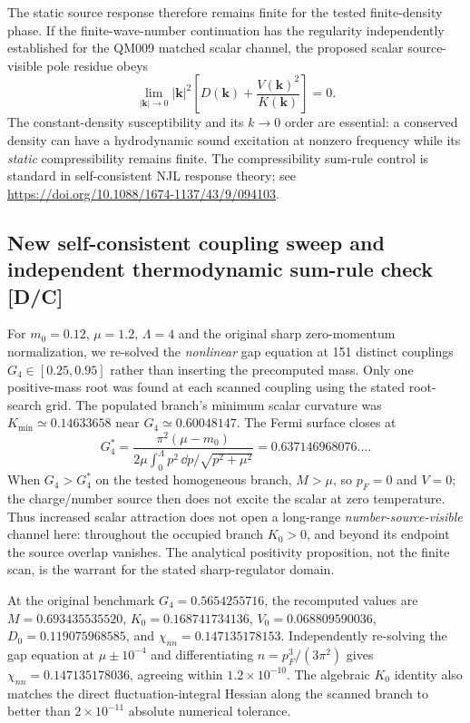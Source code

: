 \documentclass[11pt,a4paper]{article}
\begin{document}
The static source response therefore remains finite for the tested finite-density phase. If the finite-wave-number continuation has the regularity independently established for the QM009 matched scalar channel, the proposed scalar source-visible pole residue obeys
\begin{equation}\label{eq:v10-residue}
\boxed{\lim_{|\bm k|\to0}|\bm k|^2\left[D(\bm k)+\frac{V(\bm k)^2}{K(\bm k)}\right]=0.}
\end{equation}
The constant-density susceptibility and its $k\to0$ order are essential: a conserved density can have a hydrodynamic sound excitation at nonzero frequency while its \emph{static} compressibility remains finite. The compressibility sum-rule control is standard in self-consistent NJL response theory; see \url{https://doi.org/10.1088/1674-1137/43/9/094103}.

\subsection{New self-consistent coupling sweep and independent thermodynamic sum-rule check [D/C]}\label{sec:v10-numerical}
For $m_0=0.12$, $\mu=1.2$, $\Lambda=4$ and the original sharp zero-momentum normalization, we re-solved the \emph{nonlinear} gap equation at 151 distinct couplings $G_4\in[0.25,0.95]$ rather than inserting the precomputed mass. Only one positive-mass root was found at each scanned coupling using the stated root-search grid. The populated branch's minimum scalar curvature was $K_{\min}\simeq0.14633658$ near $G_4\simeq0.60048147$. The Fermi surface closes at
\begin{equation}\label{eq:v10-Gstar}
\boxed{G_4^*=\frac{\pi^2(\mu-m_0)}{2\mu\int_0^\Lambda p^2\,\dd p/\sqrt{p^2+\mu^2}}=0.637146968076\ldots.}
\end{equation}
When $G_4>G_4^*$ on the tested homogeneous branch, $M>\mu$, so $p_F=0$ and $V=0$; the charge/number source then does not excite the scalar at zero temperature. Thus increased scalar attraction does not open a long-range \emph{number-source-visible} channel here: throughout the occupied branch $K_0>0$, and beyond its endpoint the source overlap vanishes. The analytical positivity proposition, not the finite scan, is the warrant for the stated sharp-regulator domain.

At the original benchmark $G_4=0.5654255716$, the recomputed values are $M=0.693435535520$, $K_0=0.168741734136$, $V_0=0.068809590036$, $D_0=0.119075968585$, and $\chi_{nn}=0.147135178153$. Independently re-solving the gap equation at $\mu\pm10^{-4}$ and differentiating $n=p_F^3/(3\pi^2)$ gives $\chi_{nn}=0.147135178036$, agreeing within $1.2\times10^{-10}$. The algebraic $K_0$ identity also matches the direct fluctuation-integral Hessian along the scanned branch to better than $2\times10^{-11}$ absolute numerical tolerance.
\end{document}
